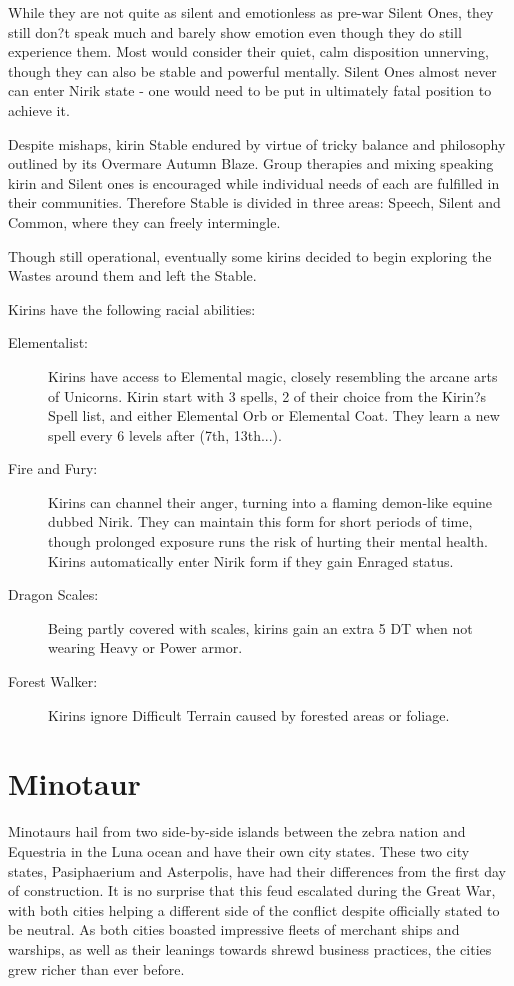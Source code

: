 \documentclass[11pt,a4paper,twocolumn]{book}
\begin{document}
	While they are not quite as silent and emotionless as pre-war Silent Ones, they still don?t speak much and barely show emotion even though they do still experience them. Most would consider their quiet, calm disposition unnerving, though they can also be stable and powerful mentally. Silent Ones almost never can enter Nirik state - one would need to be put in ultimately fatal position to achieve it.
	
	Despite mishaps, kirin Stable endured by virtue of tricky balance and philosophy outlined by its Overmare Autumn Blaze. Group therapies and mixing speaking kirin and Silent ones is encouraged while individual needs of each are fulfilled in their communities. Therefore Stable is divided in three areas: Speech, Silent and Common, where they can freely intermingle.
	
	Though still operational, eventually some kirins decided to begin exploring the Wastes around them and left the Stable.
	
	Kirins have the following racial abilities:
	\begin{description}
		\item[Elementalist:] Kirins have access to Elemental magic, closely resembling the arcane arts of Unicorns. Kirin start with 3 spells, 2 of their choice from the Kirin?s Spell list, and either Elemental Orb or Elemental Coat. They learn a new spell every 6 levels after (7th, 13th...). 
		\item[Fire and Fury:] Kirins can channel their anger, turning into a flaming demon-like equine dubbed Nirik. They can maintain this form for short periods of time, though prolonged exposure runs the risk of hurting their mental health. Kirins automatically enter Nirik form if they gain Enraged status.
		\item[Dragon Scales:] Being partly covered with scales, kirins gain an extra 5 DT when not wearing Heavy or Power armor.
		\item[Forest Walker:] Kirins ignore Difficult Terrain caused by forested areas or foliage.
	\end{description}

	\clearpage
	
	\section*{Minotaur}
	
	Minotaurs hail from two side-by-side islands between the zebra nation and Equestria in the Luna ocean and have their own city states. These two city states, Pasiphaerium and Asterpolis, have had their differences from the first day of construction. It is no surprise that this feud escalated during the Great War, with both cities helping a different side of the conflict despite officially stated to be neutral. As both cities boasted impressive fleets of merchant ships and warships, as well as their leanings towards shrewd business practices, the cities grew richer than ever before.
	
\end{document}
